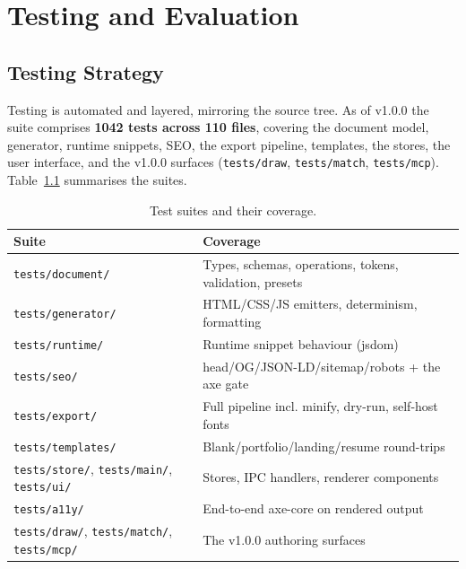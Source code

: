 
\chapter{Testing and Evaluation}
\label{ch:testing}

\section{Testing Strategy}
Testing is automated and layered, mirroring the source tree. As of v1.0.0 the
suite comprises \textbf{1042 tests across 110 files}, covering the document model,
generator, runtime snippets, SEO, the export pipeline, templates, the stores, the
user interface, and the v1.0.0 surfaces (\texttt{tests/draw}, \texttt{tests/match},
\texttt{tests/mcp}). Table~\ref{tab:suites} summarises the suites.

\begin{table}[H]
  \centering
  \caption{Test suites and their coverage.}
  \label{tab:suites}
  \small
  \begin{tabularx}{\linewidth}{@{}l X@{}}
    \toprule
    \textbf{Suite} & \textbf{Coverage} \\
    \midrule
    \texttt{tests/document/}  & Types, schemas, operations, tokens, validation, presets \\
    \texttt{tests/generator/} & HTML/CSS/JS emitters, determinism, formatting \\
    \texttt{tests/runtime/}   & Runtime snippet behaviour (jsdom) \\
    \texttt{tests/seo/}       & head/OG/JSON-LD/sitemap/robots + the axe gate \\
    \texttt{tests/export/}    & Full pipeline incl. minify, dry-run, self-host fonts \\
    \texttt{tests/templates/} & Blank/portfolio/landing/resume round-trips \\
    \texttt{tests/store/}, \texttt{tests/main/}, \texttt{tests/ui/} & Stores, IPC handlers, renderer components \\
    \texttt{tests/a11y/}      & End-to-end axe-core on rendered output \\
    \texttt{tests/draw/}, \texttt{tests/match/}, \texttt{tests/mcp/} & The v1.0.0 authoring surfaces \\
    \bottomrule
  \end{tabularx}
\end{table}


